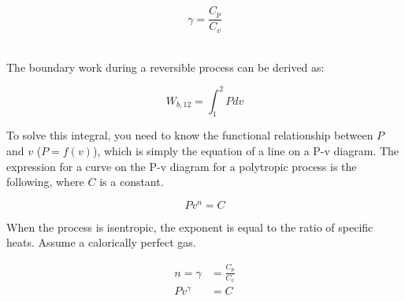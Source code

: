 \documentclass[letterpaper,12pt]{article}
\begin{document}
\begin{equation}
	\gamma = \frac{C_p}{C_v}
\end{equation}


\noindent {} \\

\noindent The boundary work during a reversible process can be derived as:

\begin{equation}
	W_{b,12} = \int_1^2{Pdv}
\end{equation}

\noindent To solve this integral, you need to know the functional relationship between $P$ and $v$ ($P = f(v)$), which is simply the equation of a line on a P-v diagram.  The expression for a curve on the P-v diagram for a polytropic process is the following, where $C$ is a constant.

\begin{equation}
	Pv^n = C
\end{equation}

\noindent When the process is isentropic, the exponent is equal to the ratio of specific heats.  Assume a calorically perfect gas.

\begin{equation}
\begin{aligned}
	n = \gamma & = \frac{C_p}{C_v} \\
	Pv^{\gamma} &= C
\end{aligned}
\end{equation}
\end{document}

